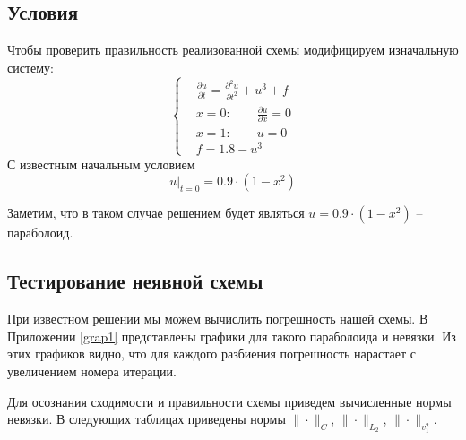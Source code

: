 \documentclass[12pt]{extarticle}
\numberwithin{equation}{section}
\begin{document}
\subsection{Условия} \label{easy}
Чтобы проверить правильность реализованной схемы модифицируем изначальную систему:
\begin{equation}
\left\{
	\begin{aligned}
&\frac{\partial u}{\partial t} = \frac{\partial ^2 u}{\partial t^2} + u^3 + f \\
& x = 0: \qquad \frac{\partial u}{\partial x} = 0\\
& x = 1: \qquad u = 0 \\
& f = 1.8 - u^3
	\end{aligned}
\right.
\label{eq:1-nachal-zadacha}
\end{equation}
С известным начальным условием
$$u |_{t=0} = 0.9 \cdot (1 - x^2)$$

Заметим, что в таком случае решением будет являться $u = 0.9 \cdot (1 - x^2)$ -- параболоид.

\subsection{Тестирование неявной схемы}
При известном решении мы можем вычислить погрешность нашей схемы.
В Приложении \ref{grap1} представлены графики для такого параболоида и невязки.
Из этих графиков видно, что для каждого разбиения погрешность нарастает с увеличением номера итерации.

Для осознания сходимости и правильности схемы приведем вычисленные нормы невязки.
В следующих таблицах приведены нормы $\|\cdot \|_C$, $\|\cdot \|_{L_2}$, $\|\cdot \|_{v_1^2}$.
\end{document}
